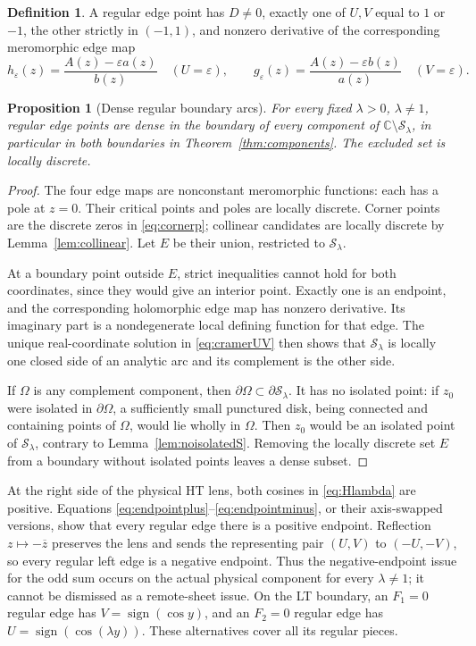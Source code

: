 \documentclass[11pt]{article}
\numberwithin{equation}{section}
\newtheorem{proposition}[theorem]{Proposition}
\theoremstyle{definition}
\newtheorem{definition}[theorem]{Definition}
\newcommand{\C}{\mathbb C}
\newcommand{\eps}{\varepsilon}
\newcommand{\cS}{\mathcal S}
\begin{document}
\begin{definition}\label{def:regularedge}
A regular edge point has \(D\ne0\), exactly one of \(U,V\) equal to
\(1\) or \(-1\), the other strictly in \((-1,1)\), and nonzero
derivative of the corresponding meromorphic edge map
\[
 h_\eps(z)=\frac{A(z)-\eps a(z)}{b(z)}
 \quad(U=\eps),\qquad
 g_\eps(z)=\frac{A(z)-\eps b(z)}{a(z)}
 \quad(V=\eps).
\]
\end{definition}

\begin{proposition}[Dense regular boundary arcs]\label{prop:regular_dense}
For every fixed \(\lambda>0\), \(\lambda\ne1\), regular edge points
are dense in the boundary of every component of
\(\C\setminus\cS_\lambda\), in particular in both boundaries in
Theorem~\ref{thm:components}. The excluded set is locally discrete.
\end{proposition}
\begin{proof}
The four edge maps are nonconstant meromorphic functions: each has a
pole at \(z=0\). Their critical points and poles are locally discrete.
Corner points are the discrete zeros in \eqref{eq:cornerp}; collinear
candidates are locally discrete by Lemma~\ref{lem:collinear}. Let
\(E\) be their union, restricted to \(\cS_\lambda\).

At a boundary point outside \(E\), strict inequalities cannot hold
for both coordinates, since they would give an interior point.
Exactly one is an endpoint, and the corresponding holomorphic edge
map has nonzero derivative. Its imaginary part is a nondegenerate
local defining function for that edge. The unique real-coordinate
solution in \eqref{eq:cramerUV} then shows that \(\cS_\lambda\) is
locally one closed side of an analytic arc and its complement is
the other side.

If \(\Omega\) is any complement component, then
\(\partial\Omega\subset\partial\cS_\lambda\). It has no isolated
point: if \(z_0\) were isolated in \(\partial\Omega\), a sufficiently
small punctured disk, being connected and containing points of
\(\Omega\), would lie wholly in \(\Omega\). Then \(z_0\) would be
an isolated point of \(\cS_\lambda\), contrary to
Lemma~\ref{lem:noisolatedS}. Removing the locally discrete set \(E\)
from a boundary without isolated points leaves a dense subset.
\end{proof}

At the right side of the physical HT lens, both cosines in
\eqref{eq:Hlambda} are positive. Equations
\eqref{eq:endpointplus}--\eqref{eq:endpointminus}, or their axis-swapped
versions, show that every regular edge there is a positive endpoint.
Reflection \(z\mapsto-\overline z\) preserves the lens and sends the
representing pair \((U,V)\) to \((-U,-V)\), so every regular left edge
is a negative endpoint. Thus the negative-endpoint issue for the odd
sum occurs on the actual physical component for every
\(\lambda\ne1\); it cannot be dismissed as a remote-sheet issue.
On the LT boundary, an \(F_1=0\) regular edge has
\(V=\operatorname{sign}(\cos y)\), and an \(F_2=0\) regular edge has
\(U=\operatorname{sign}(\cos(\lambda y))\). These alternatives cover
all its regular pieces.
\end{document}

